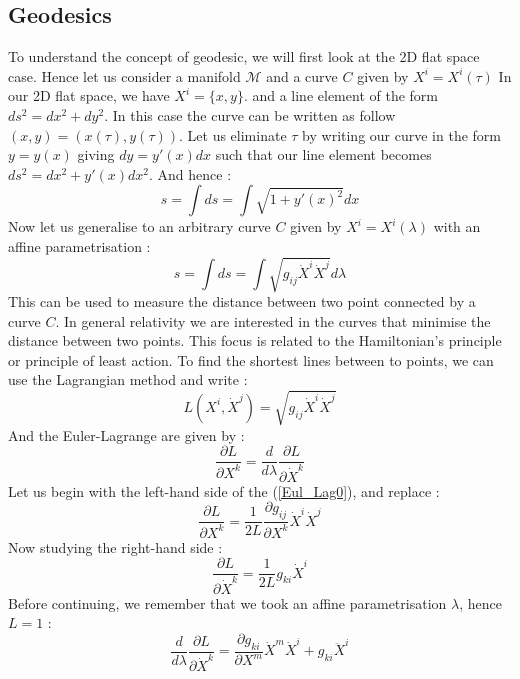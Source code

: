 \documentclass[a4paper,12pt]{article}
\theoremstyle{definition}
\begin{document}
\subsection{Geodesics}
To understand the concept of geodesic, we will first look at the 2D flat space case.
Hence let us consider a manifold $\mathcal{M}$ and a curve $C$ given by $X^i=X^i(\tau)$
In our 2D flat space, we have $X^i=\{x,y\}$. and a line element of the form $ds^2=dx^2+dy^2$.
In this case the curve can be written as follow $(x,y)=(x(\tau),y(\tau))$.
Let us eliminate $\tau$ by writing our curve in the form $y=y(x)$ giving $dy=y'(x)dx$ such that our line element becomes $ds^2=dx^2+y'(x)dx^2$.
And hence :
\begin{equation}
	s=\int ds=\int \sqrt{1+y'(x)^2}dx
\end{equation}
Now let us generalise to an arbitrary curve $C$ given by $X^i=X^i(\lambda)$ with an affine parametrisation :
\begin{equation}
	s=\int ds=\int \sqrt{g_{ij}\dot{X}^i\dot{X}^j}d\lambda
\end{equation}
This can be used to measure the distance between two point connected by a curve $C$.
In general relativity we are interested in the curves that minimise the distance between two points.
This focus is related to the Hamiltonian's principle or principle of least action.
To find the shortest lines between to points, we can use the Lagrangian method and write :
\begin{equation}
	L(X^i,\dot{X}^j)=\sqrt{g_{ij}\dot{X}^i\dot{X}^j}
\end{equation}
And the Euler-Lagrange are given by :
\begin{equation}\label{Eul_Lag0}
	\frac{\partial L}{\partial X^k}=\frac{d}{d\lambda}\frac{\partial L}{\partial \dot{X}^k}
\end{equation}
Let us begin with the left-hand side of the (\ref{Eul_Lag0}), and replace :
\begin{equation}
	\frac{\partial L}{\partial X^k}=\frac{1}{2L}\frac{\partial g_{ij}}{\partial X^k}\dot{X}^i\dot{X}^j
\end{equation}
Now studying the right-hand side :
\begin{equation}
	\frac{\partial L}{\partial \dot{X}^k}=\frac{1}{2L}g_{ki}\dot{X}^i
\end{equation}
Before continuing, we remember that we took an affine parametrisation $\lambda$, hence $L=1$ :
\begin{equation}
	\frac{d}{d\lambda}\frac{\partial L}{\partial \dot{X}^k}=
	\frac{\partial g_{ki}}{\partial X^m}\dot{X}^m\dot{X}^i+g_{ki}\ddot{X}^i
\end{equation}
\end{document}
